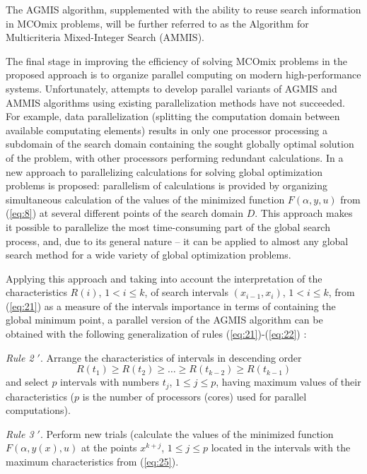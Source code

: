 \documentclass{svproc}
\begin{document}
The AGMIS algorithm, supplemented with the ability to reuse search information in MCOmix problems, will be further referred to as the Algorithm for Multicriteria Mixed-Integer Search (AMMIS).

The final stage in improving the efficiency of solving MCOmix problems in the proposed approach is to organize parallel computing on modern high-performance systems. Unfortunately, attempts to develop parallel variants of AGMIS and AMMIS algorithms using existing parallelization methods have not succeeded. For example, data parallelization (splitting the computation domain between available computating elements) results in only one processor processing a subdomain of the search domain  containing the sought globally optimal solution of the problem, with other processors performing redundant calculations.  In \cite{c24,c32} a new approach to parallelizing calculations for solving global optimization problems is proposed: parallelism of calculations is provided by organizing simultaneous calculation of the values of the minimized function $F(\alpha,y,u)$ from (\ref{eq:8}) at several different points of the search domain $D$. This approach makes it possible to parallelize the most time-consuming part of the global search process, and, due to its general nature -- it can be applied to almost any global search method for a wide variety of global optimization problems.

Applying this approach and taking into account the interpretation of the characteristics $R(i)$, $1<i \leq k$, of search intervals $(x_{i-1}, x_i)$, $1<i \leq k$, from (\ref{eq:21}) as a measure of the intervals importance in terms of containing the global minimum point, a parallel version of the AGMIS algorithm can be obtained with the following generalization of rules (\ref{eq:21})-(\ref{eq:22}) \cite{c32,c40}:

\textit{Rule 2 $'$}. Arrange the characteristics of intervals in descending order
\begin{equation}\label{eq:25}
 R(t_1) \geq R(t_2) \geq \dots \geq R(t_{k-2}) \geq R(t_{k-1})
\end{equation}
and select $p$ intervals with numbers $t_j$, $1 \leq j \leq p$, having maximum values of their characteristics ($p$ is the number of processors (cores) used for parallel computations).

\textit{Rule 3 $'$}. Perform new trials (calculate the values of the minimized function $F(\alpha,y(x),u)$ at the points $x^{k+j}$, $1 \leq j \leq p$ located in the intervals with the maximum characteristics from (\ref{eq:25}).
\end{document}
